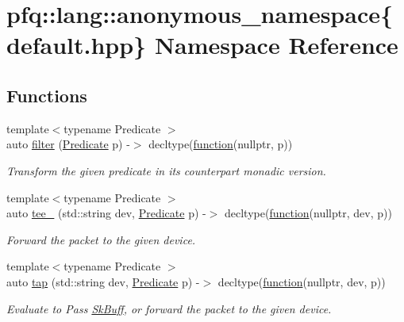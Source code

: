 \hypertarget{namespacepfq_1_1lang_1_1anonymous__namespace_02default_8hpp_03}{}\section{pfq\+:\+:lang\+:\+:anonymous\+\_\+namespace\{default.\+hpp\} Namespace Reference}
\label{namespacepfq_1_1lang_1_1anonymous__namespace_02default_8hpp_03}
\subsection*{Functions}
\begin{DoxyCompactItemize}
\item 
{\footnotesize template$<$typename Predicate $>$ }\\auto \hyperlink{namespacepfq_1_1lang_1_1anonymous__namespace_02default_8hpp_03_ab6609fc892c99d59d772832ff2ba8beb}{filter} (\hyperlink{structpfq_1_1lang_1_1Predicate}{Predicate} p) -\/$>$ decltype(\hyperlink{namespacepfq_1_1lang_a1a4638059d700ae08d0ca63886ff2bb3}{function}(nullptr, p))
\begin{DoxyCompactList}\small\item\em Transform the given predicate in its counterpart monadic version. \end{DoxyCompactList}\item 
{\footnotesize template$<$typename Predicate $>$ }\\auto \hyperlink{namespacepfq_1_1lang_1_1anonymous__namespace_02default_8hpp_03_a94260a88b04b7d42e471b954ba48d617}{tee\+\_\+} (std\+::string dev, \hyperlink{structpfq_1_1lang_1_1Predicate}{Predicate} p) -\/$>$ decltype(\hyperlink{namespacepfq_1_1lang_a1a4638059d700ae08d0ca63886ff2bb3}{function}(nullptr, dev, p))
\begin{DoxyCompactList}\small\item\em Forward the packet to the given device. \end{DoxyCompactList}\item 
{\footnotesize template$<$typename Predicate $>$ }\\auto \hyperlink{namespacepfq_1_1lang_1_1anonymous__namespace_02default_8hpp_03_aa8b81192a22fb62555e19afe4560e326}{tap} (std\+::string dev, \hyperlink{structpfq_1_1lang_1_1Predicate}{Predicate} p) -\/$>$ decltype(\hyperlink{namespacepfq_1_1lang_a1a4638059d700ae08d0ca63886ff2bb3}{function}(nullptr, dev, p))
\begin{DoxyCompactList}\small\item\em Evaluate to {\ttfamily Pass} \hyperlink{structpfq_1_1lang_1_1SkBuff}{Sk\+Buff}, or forward the packet to the given device. \end{DoxyCompactList}\item 

\end{DoxyCompactItemize}
